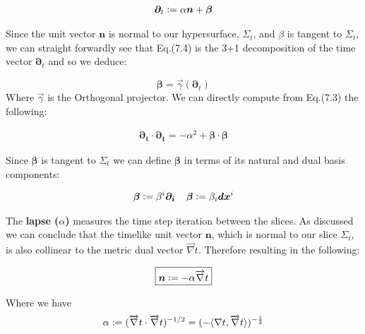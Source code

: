 \documentclass[12pt]{article}
\renewcommand{\vec}[1]{\bm{#1}}
\numberwithin{equation}{section}
\numberwithin{theorem}{subsection}
\newcommand{\defeq}{\vcentcolon=}
\begin{document}
\begin{align}

    \vec{\partial}_{t} \defeq \alpha\vec{n} + \vec{\beta}

\end{align}

Since the unit vector $\vec{n}$ is normal to our hypersurface, $\Sigma_{t}$, and $\beta$ is tangent to $\Sigma_{t}$, we can straight forwardly see that Eq.(7.4) is the 3+1 decomposition of the time vector $\vec{\partial}_{t}$ and so we deduce:

$$\vec{\beta} = \overrightarrow{\gamma}(\vec{\partial}_{t})$$ Where $\overrightarrow{\gamma}$ is the Orthogonal projector. We can directly compute from Eq.(7.3) the following:

\begin{align}

    \vec{\partial_{t}} \cdot \vec{\partial_{t}} = -\alpha^{2} + \vec{\beta} \cdot \vec{\beta} 

\end{align}

Since $\vec{\beta}$ is tangent to $\Sigma_{t}$ we can define $\vec{\beta}$ in terms of its natural and dual basis components:

\begin{align*}

    \vec{\beta} \defeq \beta^{i}\vec{\partial_{i}} \; \; \; \;

 \vec{\beta} \defeq \beta_{i}\vec{dx}^{i}\end{align*}

 

\newline The \textbf{lapse ($\alpha$)}  measures the time step iteration between the slices. As discussed we can conclude that the timelike unit vector $\vec{n}$, which is normal to our slice $\Sigma_{t}$, is also collinear to the metric dual vector $\overrightarrow{\nabla} t$. Therefore resulting in the following:

\begin{equation}

    \boxed{\vec{n} \defeq -\alpha \overrightarrow{\nabla}t}

\end{equation}

Where we have \begin{align*}

    \alpha \defeq (\overrightarrow{\nabla} t \cdot \overrightarrow{\nabla} t)^{-1/2} = (- \langle \nabla t, \overrightarrow{\nabla} t \rangle)^{-\frac{1}{2}}

\end{align*}
\end{document}
